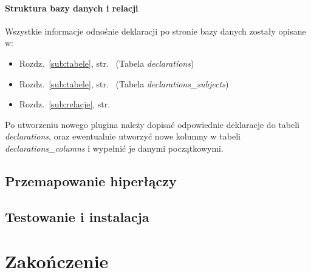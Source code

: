 \documentclass[a4paper,12pt,oneside]{report}
\begin{document}
\subsubsection{Struktura bazy danych i relacji}
Wszystkie informacje odnośnie deklaracji po stronie bazy danych zostały opisane w:
\begin{itemize}
  \item Rozdz.~\ref{sub:tabele}, str.~\pageref{subsub:declarations} (Tabela \emph{declarations})
  \item Rozdz.~\ref{sub:tabele}, str.~\pageref{subsub:declarations_subjects} (Tabela \emph{declarations\_subjects})
  \item Rozdz.~\ref{sub:relacje}, str.~\pageref{subsub:declarations-declarations_subjects}
\end{itemize}

Po utworzeniu nowego plugina należy dopisać odpowiednie deklaracje do tabeli \emph{declarations}, oraz ewentualnie utworzyć nowe kolumny w tabeli \emph{declarations\_columns} i wypełnić je danymi początkowymi.

\section{Przemapowanie hiperłączy}
\label{sec:mapa-linkow}

\section{Testowanie i instalacja}
\label{sec:testowanie}

\chapter{Zakończenie}
\label{cha:end}
\end{document}
